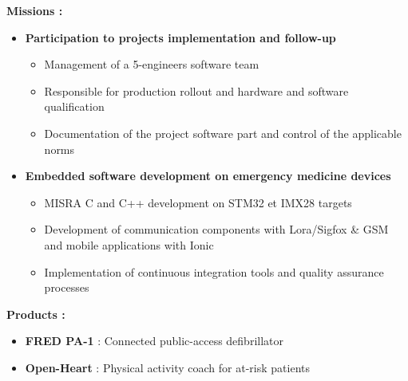 {\begin{itemize}
	\end{itemize}
\else
	\textcolor{color1}{\textbf{Missions :}}
	\begin{itemize}
		\item \textbf{Participation to projects implementation and follow-up}
		\begin{itemize}
			\item Management of a 5-engineers software team
			\item Responsible for production rollout and hardware and software qualification
			\item Documentation of the project software part and control of the applicable norms
		\end{itemize}
		\item \textbf{Embedded software development on emergency medicine devices}
		\begin{itemize}
			\item MISRA C and C++ development on STM32 et IMX28 targets
			\item Development of communication components with Lora/Sigfox \& GSM and mobile applications with Ionic
			\item Implementation of continuous integration tools and quality assurance processes
		\end{itemize}
	\end{itemize}
	\textcolor{color1}{\textbf{Products :}}
	\begin{itemize}
		\item \textbf{FRED PA-1} : Connected public-access defibrillator \textcolor{color1}{\href{http://www.schiller.ch/corp/en/product/fred-pa-1}{\ExternalLink}}
		\item \textbf{Open-Heart} : Physical activity coach for at-risk patients \textcolor{color1}{\href{http://www.schiller.ch/corp/en/schiller-cutting-edge-connected-health}{\ExternalLink}}
	\end{itemize}
\fi
}



\vspace{\ItemsSpacing}

